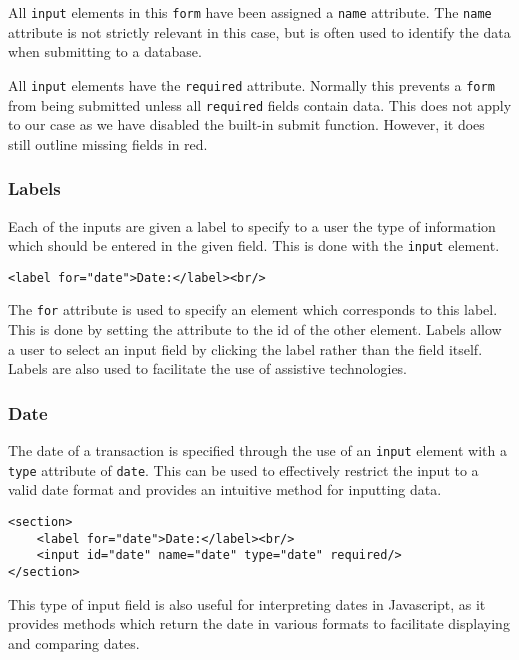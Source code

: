 \documentclass[letterpaper]{article}
\begin{document}
All \lstinline{input} elements in this \lstinline{form} have been assigned a \lstinline{name} attribute.
The \lstinline{name} attribute is not strictly relevant in this case, but is often used to identify the data when submitting to a database.

All \lstinline{input} elements have the \lstinline{required} attribute.
Normally this prevents a \lstinline{form} from being submitted unless all \lstinline{required} fields contain data.
This does not apply to our case as we have disabled the built-in submit function.
However, it does still outline missing fields in red.

\subsubsection{Labels}

Each of the inputs are given a label to specify to a user the type of information which should be entered in the given field.
This is done with the \lstinline{input} element.

\begin{lstlisting}[firstnumber=12]
<label for="date">Date:</label><br/>
\end{lstlisting}

The \lstinline{for} attribute is used to specify an element which corresponds to this label.
This is done by setting the attribute to the id of the other element.
Labels allow a user to select an input field by clicking the label rather than the field itself.
Labels are also used to facilitate the use of assistive technologies.

\subsubsection{Date}

The date of a transaction is specified through the use of an \lstinline{input} element with a \lstinline{type} attribute of \lstinline{date}.
This can be used to effectively restrict the input to a valid date format and provides an intuitive method for inputting data.

\begin{lstlisting}[firstnumber=11]
<section>
    <label for="date">Date:</label><br/>
    <input id="date" name="date" type="date" required/>
</section>
\end{lstlisting}

This type of input field is also useful for interpreting dates in Javascript, as it provides methods which return the date in various formats to facilitate displaying and comparing dates.
\end{document}
